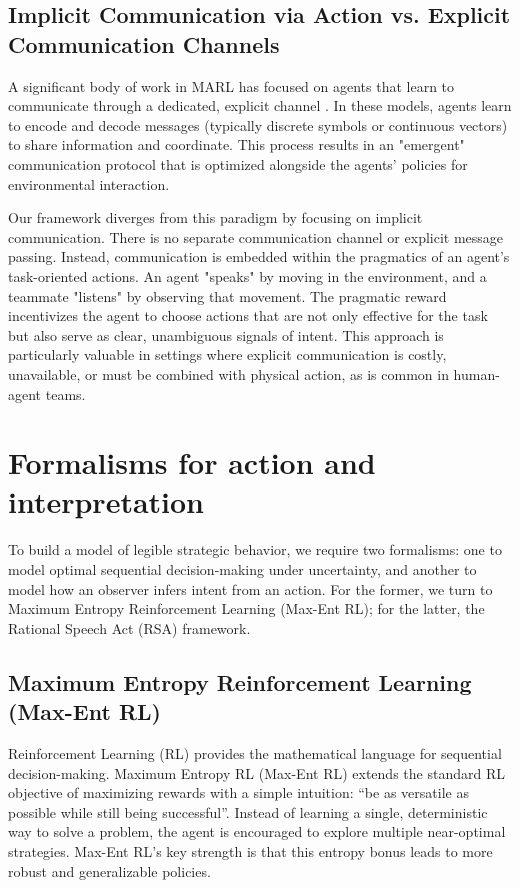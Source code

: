 \documentclass{article}
\begin{document}
\subsection{Implicit Communication via Action vs. Explicit Communication Channels}

A significant body of work in MARL has focused on agents that learn to communicate through a dedicated, explicit channel \cite{foerster2016learning, sukhbaatar2016learning}. In these models, agents learn to encode and decode messages (typically discrete symbols or continuous vectors) to share information and coordinate. This process results in an "emergent" communication protocol that is optimized alongside the agents' policies for environmental interaction.

Our framework diverges from this paradigm by focusing on implicit communication. There is no separate communication channel or explicit message passing. Instead, communication is embedded within the pragmatics of an agent's task-oriented actions. An agent "speaks" by moving in the environment, and a teammate "listens" by observing that movement. The pragmatic reward incentivizes the agent to choose actions that are not only effective for the task but also serve as clear, unambiguous signals of intent. This approach is particularly valuable in settings where explicit communication is costly, unavailable, or must be combined with physical action, as is common in human-agent teams.


\section{Formalisms for action and interpretation}
\label{sec:background}

To build a model of legible strategic behavior, we require two formalisms: one to model optimal sequential decision-making under uncertainty, and another to model how an observer infers intent from an action. For the former, we turn to Maximum Entropy Reinforcement Learning (Max-Ent RL); for the latter, the Rational Speech Act (RSA) framework.

\subsection{Maximum Entropy Reinforcement Learning (Max-Ent RL)}
\label{ssec:maxentrl}

Reinforcement Learning (RL) provides the mathematical language for sequential decision-making. Maximum Entropy RL (Max-Ent RL) extends the standard RL objective of maximizing rewards with a simple intuition: ``be as versatile as possible while still being successful''. Instead of learning a single, deterministic way to solve a problem, the agent is encouraged to explore multiple near-optimal strategies. Max-Ent RL's key strength is that this entropy bonus leads to more robust and generalizable policies.
\end{document}
